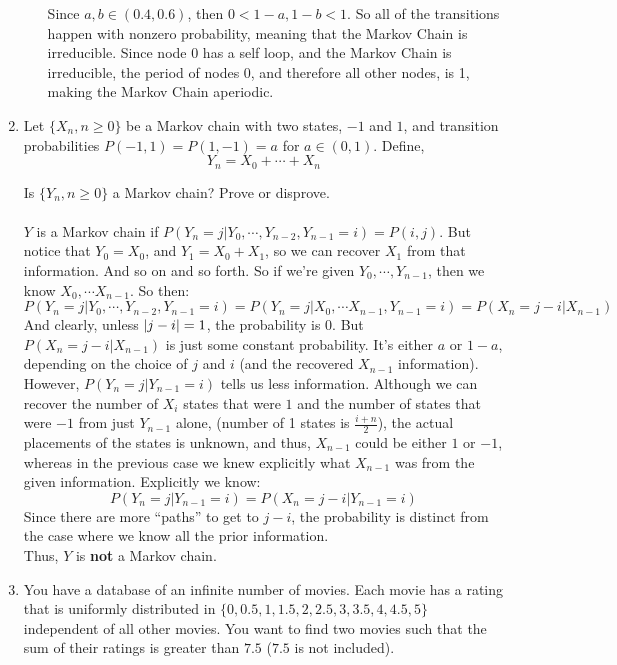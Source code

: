 \begin{enumerate}
\begin{enumerate}
        Since $a,b \in (0.4,0.6)$, then $0 < 1-a, 1-b < 1$. So all of the transitions happen with nonzero probability, meaning that the Markov Chain is irreducible. Since node 0 has a self loop, and the Markov Chain is irreducible, the period of nodes 0, and therefore all other nodes, is 1, making the Markov Chain aperiodic.
    \end{enumerate}
    
  \item Let $\{ X_n, n \geq 0 \}$ be a Markov chain with two states, $-1$ and $1$, and transition probabilities $P(-1,1) = P(1,-1) = a$ for $a \in (0,1)$. Define,
    $$Y_n = X_0 + \cdots + X_n$$

    Is $\{ Y_n, n \geq 0 \}$ a Markov chain? Prove or disprove.\\\\

    $Y$ is a Markov chain if $P(Y_n = j | Y_0, \cdots, Y_{n-2}, Y_{n-1} = i) = P(i,j)$. But notice that $Y_0 = X_0$, and $Y_1 = X_0 + X_1$, so we can recover $X_1$ from that information. And so on and so forth. So if we're given $Y_0, \cdots, Y_{n-1}$, then we know $X_0, \cdots X_{n-1}$. So then:
    $$P(Y_n = j | Y_0, \cdots, Y_{n-2}, Y_{n-1} = i) = P(Y_n = j | X_0, \cdots X_{n-1}, Y_{n-1} = i) = P(X_n = j-i | X_{n-1})$$
    And clearly, unless $\left\vert j-i \right\vert = 1$, the probability is $0$. But $P(X_n = j-i | X_{n-1})$ is just some constant probability. It's either $a$ or $1-a$, depending on the choice of $j$ and $i$ (and the recovered $X_{n-1}$ information).\\

    However, $P(Y_n = j | Y_{n-1} = i)$ tells us less information. Although we can recover the number of $X_i$ states that were $1$ and the number of states that were $-1$ from just $Y_{n-1}$ alone, (number of 1 states is $\frac{i + n}{2}$), the actual placements of the states is unknown, and thus, $X_{n-1}$ could be either $1$ or $-1$, whereas in the previous case we knew explicitly what $X_{n-1}$ was from the given information. Explicitly we know:
    $$P(Y_n = j | Y_{n-1} = i) = P(X_n = j-i | Y_{n-1} = i)$$
    Since there are more ``paths'' to get to $j-i$, the probability is distinct from the case where we know all the prior information.\\

    Thus, $Y$ is \textbf{not} a Markov chain.

  \item You have a database of an infinite number of movies. Each movie has a rating that is uniformly distributed in $\{0, 0.5, 1, 1.5, 2, 2.5, 3, 3.5, 4, 4.5, 5 \}$ independent of all other movies. You want to find two movies such that the sum of their ratings is greater than $7.5$ ($7.5$ is not included).


\end{enumerate}
